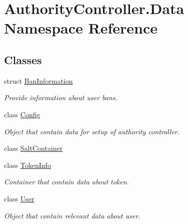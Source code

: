 \hypertarget{namespace_authority_controller_1_1_data}{}\section{Authority\+Controller.\+Data Namespace Reference}
\label{namespace_authority_controller_1_1_data}
\subsection*{Classes}
\begin{DoxyCompactItemize}
\item 
struct \mbox{\hyperlink{struct_authority_controller_1_1_data_1_1_ban_information}{Ban\+Information}}
\begin{DoxyCompactList}\small\item\em Provide information about user bans. \end{DoxyCompactList}\item 
class \mbox{\hyperlink{class_authority_controller_1_1_data_1_1_config}{Config}}
\begin{DoxyCompactList}\small\item\em Object that contain data for setup of authority controller. \end{DoxyCompactList}\item 
class \mbox{\hyperlink{class_authority_controller_1_1_data_1_1_salt_container}{Salt\+Container}}
\item 
class \mbox{\hyperlink{class_authority_controller_1_1_data_1_1_token_info}{Token\+Info}}
\begin{DoxyCompactList}\small\item\em Container that contain data about token. \end{DoxyCompactList}\item 
class \mbox{\hyperlink{class_authority_controller_1_1_data_1_1_user}{User}}
\begin{DoxyCompactList}\small\item\em Object that contain relevant data about user. \end{DoxyCompactList}\end{DoxyCompactItemize}
